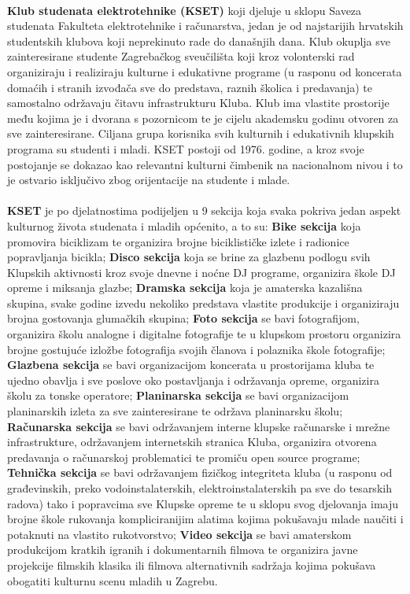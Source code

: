\documentclass[12pt,a4paper,oneside]{article}
\begin{document}
\paragraph{} \textbf{Klub studenata elektrotehnike (KSET)} koji djeluje u sklopu Saveza studenata
Fakulteta elektrotehnike i računarstva, jedan je od najstarijih hrvatskih studentskih klubova
koji neprekinuto rade do današnjih dana. Klub okuplja sve zainteresirane studente
Zagrebačkog sveučilišta koji kroz volonterski rad organiziraju i realiziraju kulturne i
edukativne programe (u rasponu od koncerata domaćih i stranih izvođača sve do predstava,
raznih školica i predavanja) te samostalno održavaju čitavu infrastrukturu Kluba. Klub ima
vlastite prostorije među kojima je i dvorana s pozornicom te je cijelu akademsku godinu
otvoren za sve zainteresirane. Ciljana grupa korisnika svih kulturnih i edukativnih klupskih
programa su studenti i mladi. KSET postoji od 1976. godine, a kroz svoje postojanje se dokazao kao
relevantni kulturni čimbenik na nacionalnom nivou i to je ostvario isključivo zbog orijentacije
na studente i mlade.


\paragraph{} \textbf{KSET} je po djelatnostima podijeljen u 9 sekcija koja svaka pokriva jedan aspekt kulturnog života studenata i mladih općenito, a to su: \textbf{Bike sekcija} koja promovira biciklizam te organizira brojne biciklističke izlete i radionice popravljanja bicikla; \textbf{Disco sekcija} koja se brine za glazbenu podlogu svih Klupskih aktivnosti kroz svoje dnevne i noćne DJ programe, organizira škole DJ opreme i miksanja glazbe; \textbf{Dramska sekcija} koja je amaterska kazališna skupina, svake godine izvedu nekoliko predstava vlastite produkcije i organiziraju brojna gostovanja glumačkih skupina; \textbf{Foto sekcija} se bavi fotografijom, organizira školu analogne i digitalne fotografije te u klupskom prostoru organizira brojne gostujuće izložbe fotografija svojih članova i polaznika škole fotografije; \textbf{Glazbena sekcija} se
bavi organizacijom koncerata u prostorijama kluba te ujedno obavlja i sve poslove oko postavljanja i održavanja opreme, organizira školu za tonske operatore; \textbf{Planinarska sekcija} se bavi organizacijom planinarskih izleta za
sve zainteresirane te održava planinarsku školu; \textbf{Računarska sekcija} se bavi održavanjem
interne klupske računarske i mrežne infrastrukture, održavanjem internetskih stranica Kluba,
organizira otvorena predavanja o računarskoj problematici te promiču open source
programe; \textbf{Tehnička sekcija} se bavi
održavanjem fizičkog integriteta kluba (u rasponu od građevinskih, preko vodoinstalaterskih, elektroinstalaterskih pa sve do tesarskih radova) tako i popravcima sve Klupske opreme te u sklopu svog djelovanja imaju brojne škole rukovanja kompliciranijim alatima
kojima pokušavaju mlade naučiti i potaknuti na vlastito rukotvorstvo; \textbf{Video sekcija} se bavi amaterskom produkcijom kratkih igranih i dokumentarnih filmova te organizira javne
projekcije filmskih klasika ili filmova alternativnih sadržaja kojima pokušava obogatiti
kulturnu scenu mladih u Zagrebu.
\end{document}
